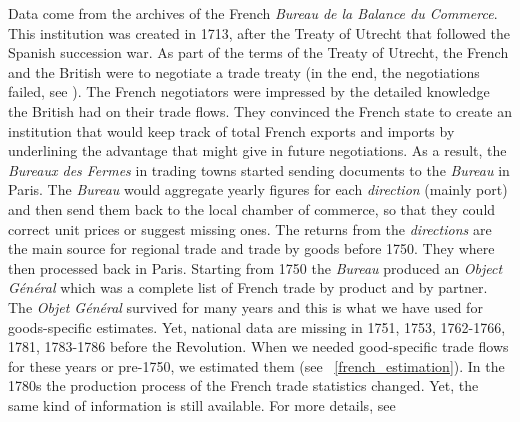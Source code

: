 \documentclass[12pt,a4paper,titlepage,english]{article}
\begin{document}
Data come from the archives of the French \textit{Bureau de la Balance du Commerce}. This institution was created in 1713, after the Treaty of Utrecht that followed the Spanish succession war.
As part of the terms of the Treaty of Utrecht, the French and the British were to negotiate a trade treaty (in the end, the negotiations failed, see \cite{schnakenbourg_les_2004}).
The French negotiators were  impressed by the detailed knowledge the British had on their trade flows. They convinced the French state to create an institution that would keep track of total French exports and imports by underlining the advantage that might give in future negotiations.
As a result, the \textit{Bureaux des Fermes}  in trading towns started sending documents to the \textit{Bureau} in Paris.
The \textit{Bureau} would aggregate yearly figures for each \textit{direction} (mainly port) and then send them back to the local chamber of commerce, so that they could correct unit prices or suggest missing ones. 
The returns from the \textit{directions} are the main source for regional trade and trade by goods before 1750. They where then processed back in Paris.
Starting from 1750 the \textit{Bureau} produced an \textit{Object Général} which was a complete list of French trade by product and by partner.
The \textit{Objet Général} survived for many years and this is what we have used for goods-specific estimates.
Yet, national data are missing in 1751, 1753, 1762-1766, 1781, 1783-1786 before the Revolution.
When we needed  good-specific trade flows for these years or pre-1750, we estimated them (see ~\ref{french_estimation}).
In the 1780s the production process of the French trade statistics changed. Yet, the same kind of information is still available.
For more details, see \cite{charles_collecte_2011}
\end{document}
